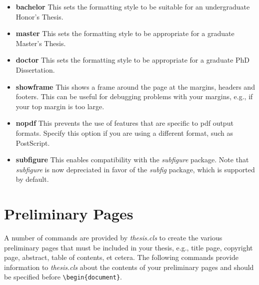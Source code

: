 \documentclass[master]{thesis}
\begin{document}
\begin{itemize}
    \item \textbf{bachelor}  This sets the formatting style to be suitable for an undergraduate Honor's Thesis.

    \item \textbf{master}  This sets the formatting style to be appropriate for a graduate Master's Thesis.

    \item \textbf{doctor}  This sets the formatting style to be appropriate for a graduate PhD Dissertation.

    \item \textbf{showframe}  This shows a frame around the page at the margins, headers and footers.  This can be useful for debugging problems with your margins, e.g., if your top margin is too large.

    \item \textbf{nopdf}  This prevents the use of features that are specific to pdf output formats.  Specify this option if you are using a different format, such as PostScript.

    \item \textbf{subfigure}  This enables compatibility with the \textit{subfigure} package.  Note that \textit{subfigure} is now depreciated in favor of the \textit{subfig} package, which is supported by default.
\end{itemize}

\section{Preliminary Pages}

A number of commands are provided by \textit{thesis.cls} to create the various preliminary pages that must be included in your thesis, e.g., title page, copyright page, abstract, table of contents, et cetera.  The following commands provide information to \textit{thesis.cls} about the contents of your preliminary pages and should be specified before \verb|\begin{document}|.
\end{document}
